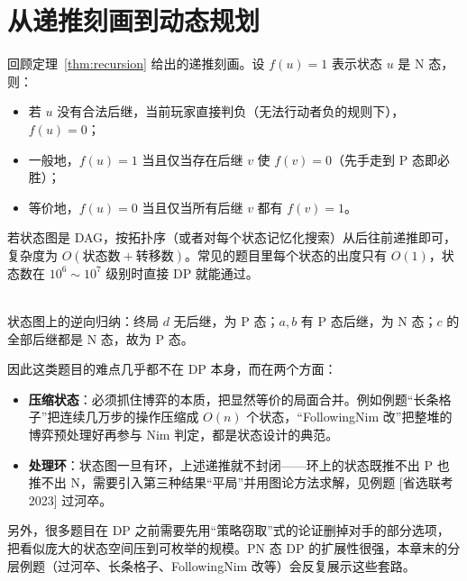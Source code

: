\documentclass[UTF8,a4paper,11pt,oneside,openany,fontset=fandol]{ctexbook}
\theoremstyle{definition}
\begin{document}
\section{从递推刻画到动态规划}
回顾定理~\ref{thm:recursion} 给出的递推刻画。设 $f(u)=1$ 表示状态 $u$ 是 N 态，则：
\begin{itemize}
\item 若 $u$ 没有合法后继，当前玩家直接判负（无法行动者负的规则下），$f(u)=0$；
\item 一般地，$f(u)=1$ 当且仅当存在后继 $v$ 使 $f(v)=0$（先手走到 P 态即必胜）；
\item 等价地，$f(u)=0$ 当且仅当所有后继 $v$ 都有 $f(v)=1$。
\end{itemize}
若状态图是 DAG，按拓扑序（或者对每个状态记忆化搜索）从后往前递推即可，复杂度为 $O(\text{状态数}+\text{转移数})$。常见的题目里每个状态的出度只有 $O(1)$，状态数在 $10^6\sim10^7$ 级别时直接 DP 就能通过。

\begin{center}
\\[2pt]
{\small 状态图上的逆向归纳：终局 $d$ 无后继，为 P 态；$a,b$ 有 P 态后继，为 N 态；$c$ 的全部后继都是 N 态，故为 P 态。}
\end{center}

因此这类题目的难点几乎都不在 DP 本身，而在两个方面：
\begin{itemize}
\item \textbf{压缩状态}：必须抓住博弈的本质，把显然等价的局面合并。例如例题“长条格子”把连续几万步的操作压缩成 $O(n)$ 个状态，“FollowingNim 改”把整堆的博弈预处理好再参与 Nim 判定，都是状态设计的典范。
\item \textbf{处理环}：状态图一旦有环，上述递推就不封闭——环上的状态既推不出 P 也推不出 N，需要引入第三种结果“平局”并用图论方法求解，见例题 [省选联考 2023] 过河卒。
\end{itemize}

另外，很多题目在 DP 之前需要先用“策略窃取”式的论证删掉对手的部分选项，把看似庞大的状态空间压到可枚举的规模。PN 态 DP 的扩展性很强，本章末的分层例题（过河卒、长条格子、FollowingNim 改等）会反复展示这些套路。
\end{document}
